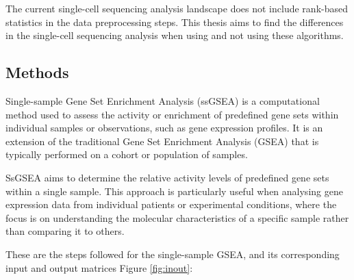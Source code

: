 \documentclass[aps,prb,twocolumn,superscriptaddress,floatfix,longbibliography]{revtex4-2}
\newif\ifptitle
\newif\ifpnumber
\newcounter{para}
\newcommand\ptitle[1]{\par\refstepcounter{para}
{\ifpnumber{\noindent\textcolor{lightgray}{\textbf{\thepara}}\indent}\fi}
{\ifptitle{\textbf{[{#1}]}}\fi}}
\begin{document}
The current single-cell sequencing analysis landscape does not include rank-based statistics in the data preprocessing steps. This thesis aims to find the differences in the single-cell sequencing analysis when using and not using these algorithms.

\subsection{Methods}

\ptitle{Rank-based statistics} Single-sample Gene Set Enrichment Analysis (ssGSEA) is a computational method used to assess the activity or enrichment of predefined gene sets within individual samples or observations, such as gene expression profiles. It is an extension of the traditional Gene Set Enrichment Analysis (GSEA) that is typically performed on a cohort or population of samples.

SsGSEA aims to determine the relative activity levels of predefined gene sets within a single sample. This approach is particularly useful when analysing gene expression data from individual patients or experimental conditions, where the focus is on understanding the molecular characteristics of a specific sample rather than comparing it to others.

\vspace{2mm}

\label{sec:ks-statistic}
These are the steps followed for the single-sample GSEA, and its corresponding input and output matrices Figure \ref{fig:inout}:
\end{document}
